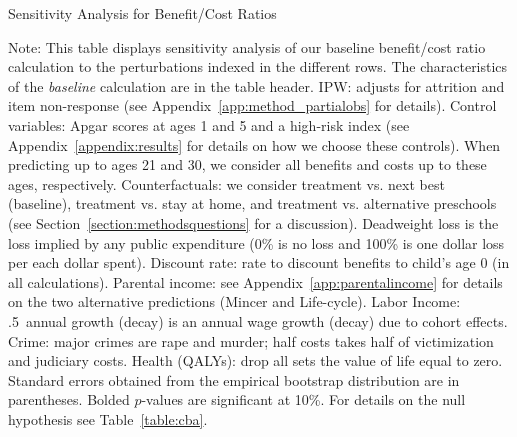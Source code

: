 \begin{table}
\begin{threeparttable}
\caption{Sensitivity Analysis for Benefit/Cost Ratios}
\label{table:bcsens}
\centering
\footnotesize

\begin{tablenotes}
\footnotesize
\item Note: This table displays sensitivity analysis of our baseline benefit/cost ratio calculation to the perturbations indexed in the different rows. The characteristics of the \textit{baseline} calculation are in the table header. IPW: adjusts for attrition and item non-response (see Appendix~\ref{app:method_partialobs} for details). Control variables: Apgar scores at ages 1 and 5 and a high-risk index (see Appendix~\ref{appendix:results} for details on how we choose these controls). When predicting up to ages 21 and 30, we consider all benefits and costs up to these ages, respectively. Counterfactuals: we consider treatment vs. next best (baseline), treatment vs. stay at home, and treatment vs. alternative preschools (see Section~\ref{section:methodsquestions} for a discussion). Deadweight loss is the loss implied by any public expenditure (0\% is no loss and 100\% is one dollar loss per each dollar spent). Discount rate: rate to discount benefits to child's age 0 (in all calculations). Parental income: see Appendix~\ref{app:parentalincome} for details on the two alternative predictions (Mincer and Life-cycle). Labor Income: .5\ annual growth (decay) is an annual wage growth (decay) due to cohort effects. Crime: major crimes are rape and murder; half costs takes half of victimization and judiciary costs. Health (QALYs): drop all sets the value of life equal to zero. Standard errors obtained from the empirical bootstrap distribution are in parentheses. Bolded $p$-values are significant at 10\%. For details on the null hypothesis see Table~\ref{table:cba}.
\end{tablenotes}
\end{threeparttable}
\end{table}

